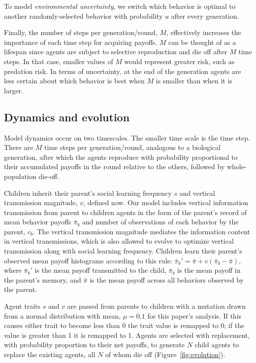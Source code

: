 \documentclass[10pt,letterpaper]{article}
\begin{document}
To model \emph{environmental uncertainty}, we switch which behavior is optimal
to another randomly-selected behavior with probability $u$ after every generation.

Finally, the number of steps per generation/round, $M$, effectively increases the
importance of each time step for acquiring payoffs. $M$ can be thought of as a
lifespan since agents are subject to selective reproduction and die off after 
$M$ time steps. In that case, smaller values of $M$ would represent greater risk,
such as predation risk. In terms of uncertainty, 
at the end of the generation agents are less certain about which behavior is best
when $M$ is smaller than when it is larger.


\subsection{Dynamics and evolution}

Model dynamics occur on two timescales. The smaller time scale is the time step.
There are $M$ time steps per generation/round, analogous to a biological generation, 
after which the agents reproduce with probability proportional to their 
accumulated payoffs in the round relative to the others, 
followed by whole-population die-off. 

Children inherit their parent's social learning frequency $s$ and vertical
transmission magnitude, $v$, defined now. Our model includes vertical information
transmission from parent to children agents in the form of 
the parent's record of mean behavior payoffs $\bar\pi_b$ and number of observations
of each behavior by the parent, $c_b$. 
The vertical transmission magnitude mediates the information content in
vertical transmissions, which is also allowed to evolve to 
optimize vertical transmission along with social learning frequency. Children learn
their parent's observed mean payoff histograms according to this rule: 
$\bar\pi_b' = \bar\pi + v(\bar\pi_b - \bar\pi)$, 
where $\bar\pi_b'$ is the mean payoff transmitted to the child, 
$\bar\pi_b$ is the mean payoff in the parent's memory, and $\bar \pi$ is the 
mean payoff across all behaviors observed by the parent.

Agent traits $s$ and $v$ are passed from parents to children with a mutation drawn
from a normal distribution with mean, $\mu = 0.1$ for this paper's analysis.
If this causes either trait to become less than 0 the trait value is remapped to
0; if the value is greater than 1 it is remapped to 1. Agents are selected
with replacement, with probability proportion to their net payoffs, to generate
$N$ child agents to replace the existing agents, all $N$ of whom die off 
(Figure~\ref{fig:evolution}).
\end{document}
